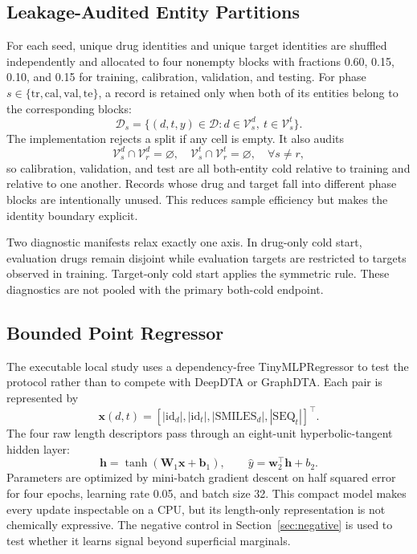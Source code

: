 \documentclass[lettersize,journal]{IEEEtran}
\begin{document}
\subsection{Leakage-Audited Entity Partitions}
For each seed, unique drug identities and unique target identities are shuffled independently and allocated to four nonempty blocks with fractions 0.60, 0.15, 0.10, and 0.15 for training, calibration, validation, and testing. For phase $s\in\{\mathrm{tr},\mathrm{cal},\mathrm{val},\mathrm{te}\}$, a record is retained only when both of its entities belong to the corresponding blocks:
\begin{equation}
\mathcal{D}_{s}=\{(d,t,y)\in\mathcal{D}:d\in\mathcal{V}^{d}_{s},\ t\in\mathcal{V}^{t}_{s}\}.
\end{equation}
The implementation rejects a split if any cell is empty. It also audits
\begin{equation}
\mathcal{V}^{d}_{s}\cap\mathcal{V}^{d}_{r}=\varnothing,
\quad
\mathcal{V}^{t}_{s}\cap\mathcal{V}^{t}_{r}=\varnothing,
\quad \forall s\neq r,
\end{equation}
so calibration, validation, and test are all both-entity cold relative to training and relative to one another. Records whose drug and target fall into different phase blocks are intentionally unused. This reduces sample efficiency but makes the identity boundary explicit.

Two diagnostic manifests relax exactly one axis. In drug-only cold start, evaluation drugs remain disjoint while evaluation targets are restricted to targets observed in training. Target-only cold start applies the symmetric rule. These diagnostics are not pooled with the primary both-cold endpoint.

\subsection{Bounded Point Regressor}
The executable local study uses a dependency-free TinyMLPRegressor to test the protocol rather than to compete with DeepDTA or GraphDTA. Each pair is represented by
\begin{equation}
\mathbf{x}(d,t)=
[|\mathrm{id}_d|,|\mathrm{id}_t|,|\mathrm{SMILES}_d|,|\mathrm{SEQ}_t|]^\top.
\end{equation}
The four raw length descriptors pass through an eight-unit hyperbolic-tangent hidden layer:
\begin{equation}
\mathbf{h}=\tanh(\mathbf{W}_1\mathbf{x}+\mathbf{b}_1),\qquad
\hat y=\mathbf{w}_2^\top\mathbf{h}+b_2.
\end{equation}
Parameters are optimized by mini-batch gradient descent on half squared error for four epochs, learning rate 0.05, and batch size 32. This compact model makes every update inspectable on a CPU, but its length-only representation is not chemically expressive. The negative control in Section~\ref{sec:negative} is used to test whether it learns signal beyond superficial marginals.
\end{document}
